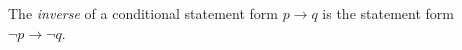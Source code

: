 \guard



\begin{defn}
\label{defn:inverse}
  The \emph{inverse} of a conditional statement form $p\rightarrow q$ is the statement form $\neg p\rightarrow \neg q$.
\end{defn}
